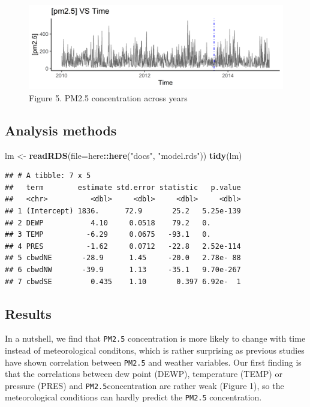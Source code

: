 \documentclass[]{article}
\newenvironment{Shaded}{\begin{snugshade}}{\end{snugshade}}
\newcommand{\DataTypeTok}[1]{\textcolor[rgb]{0.13,0.29,0.53}{#1}}
\newcommand{\KeywordTok}[1]{\textcolor[rgb]{0.13,0.29,0.53}{\textbf{#1}}}
\newcommand{\NormalTok}[1]{#1}
\newcommand{\OperatorTok}[1]{\textcolor[rgb]{0.81,0.36,0.00}{\textbf{#1}}}
\newcommand{\StringTok}[1]{\textcolor[rgb]{0.31,0.60,0.02}{#1}}
\begin{document}
\begin{figure}
\centering
\includegraphics{../images/year_PM2.5.png}
\caption{Figure 5. PM2.5 concentration across years}
\end{figure}

\hypertarget{analysis-methods}{%
\subsection{Analysis methods}\label{analysis-methods}}

\begin{Shaded}
\begin{Highlighting}[]
\NormalTok{lm <-}\StringTok{ }\KeywordTok{readRDS}\NormalTok{(}\DataTypeTok{file=}\NormalTok{here}\OperatorTok{::}\KeywordTok{here}\NormalTok{(}\StringTok{"docs"}\NormalTok{, }\StringTok{"model.rds"}\NormalTok{))}
\KeywordTok{tidy}\NormalTok{(lm)}
\end{Highlighting}
\end{Shaded}

\begin{verbatim}
## # A tibble: 7 x 5
##   term        estimate std.error statistic   p.value
##   <chr>          <dbl>     <dbl>     <dbl>     <dbl>
## 1 (Intercept) 1836.      72.9       25.2   5.25e-139
## 2 DEWP           4.10     0.0518    79.2   0.       
## 3 TEMP          -6.29     0.0675   -93.1   0.       
## 4 PRES          -1.62     0.0712   -22.8   2.52e-114
## 5 cbwdNE       -28.9      1.45     -20.0   2.78e- 88
## 6 cbwdNW       -39.9      1.13     -35.1   9.70e-267
## 7 cbwdSE         0.435    1.10       0.397 6.92e-  1
\end{verbatim}

\hypertarget{results}{%
\subsection{Results}\label{results}}

In a nutshell, we find that \texttt{PM2.5} concentration is more likely
to change with time instead of meteorological conditons, which is rather
surprising as previous studies have shown correlation between
\texttt{PM2.5} and weather variables. Our first finding is that the
correlations between dew point (DEWP), temperature (TEMP) or pressure
(PRES) and \texttt{PM2.5}concentration are rather weak (Figure 1), so
the meteorological conditions can hardly predict the \texttt{PM2.5}
concentration.
\end{document}
